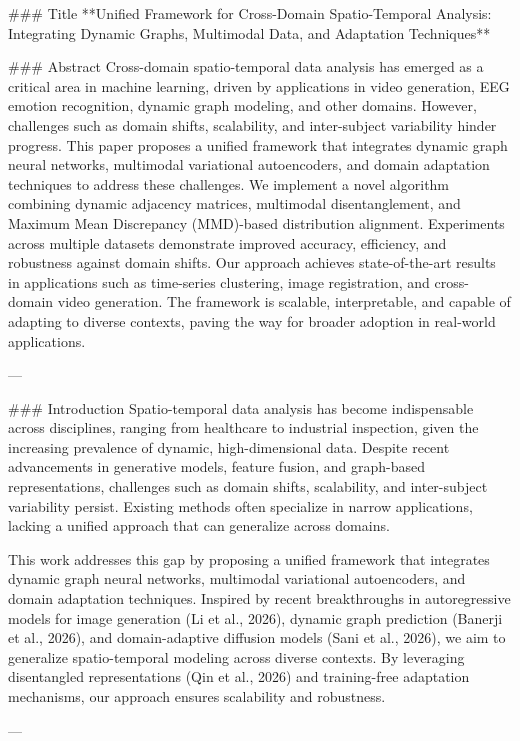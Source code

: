 ### Title  
**Unified Framework for Cross-Domain Spatio-Temporal Analysis: Integrating Dynamic Graphs, Multimodal Data, and Adaptation Techniques**

### Abstract  
Cross-domain spatio-temporal data analysis has emerged as a critical area in machine learning, driven by applications in video generation, EEG emotion recognition, dynamic graph modeling, and other domains. However, challenges such as domain shifts, scalability, and inter-subject variability hinder progress. This paper proposes a unified framework that integrates dynamic graph neural networks, multimodal variational autoencoders, and domain adaptation techniques to address these challenges. We implement a novel algorithm combining dynamic adjacency matrices, multimodal disentanglement, and Maximum Mean Discrepancy (MMD)-based distribution alignment. Experiments across multiple datasets demonstrate improved accuracy, efficiency, and robustness against domain shifts. Our approach achieves state-of-the-art results in applications such as time-series clustering, image registration, and cross-domain video generation. The framework is scalable, interpretable, and capable of adapting to diverse contexts, paving the way for broader adoption in real-world applications.

---

### Introduction  
Spatio-temporal data analysis has become indispensable across disciplines, ranging from healthcare to industrial inspection, given the increasing prevalence of dynamic, high-dimensional data. Despite recent advancements in generative models, feature fusion, and graph-based representations, challenges such as domain shifts, scalability, and inter-subject variability persist. Existing methods often specialize in narrow applications, lacking a unified approach that can generalize across domains.

This work addresses this gap by proposing a unified framework that integrates dynamic graph neural networks, multimodal variational autoencoders, and domain adaptation techniques. Inspired by recent breakthroughs in autoregressive models for image generation (Li et al., 2026), dynamic graph prediction (Banerji et al., 2026), and domain-adaptive diffusion models (Sani et al., 2026), we aim to generalize spatio-temporal modeling across diverse contexts. By leveraging disentangled representations (Qin et al., 2026) and training-free adaptation mechanisms, our approach ensures scalability and robustness.

---

